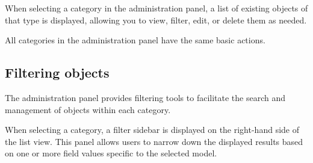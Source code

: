 When selecting a category in the administration panel, a list of existing objects of that type is displayed, allowing you to view, filter, edit, or delete them as needed.



All categories in the administration panel have the same basic actions.

\subsection*{Filtering objects}

The administration panel provides filtering tools to facilitate the search and management of objects within each category.

When selecting a category, a filter sidebar is displayed on the right-hand side of the list view. This panel allows users to narrow down the displayed results based on one or more field values specific to the selected model.

